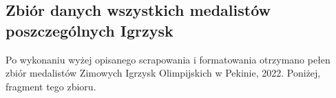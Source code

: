 \documentclass[a4paper,11pt]{article}
\begin{document}
\subsection{Zbiór danych wszystkich medalistów poszczególnych Igrzysk}
Po wykonaniu wyżej opisanego scrapowania i formatowania otrzymano pełen zbiór
medalistów Zimowych Igrzysk Olimpijskich w Pekinie, 2022. Poniżej, fragment tego zbioru.
\begin{center}
\end{center}
\end{document}
